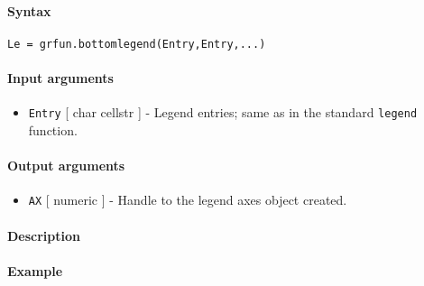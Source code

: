 


	\paragraph{Syntax}

\begin{verbatim}
Le = grfun.bottomlegend(Entry,Entry,...)
\end{verbatim}

\paragraph{Input arguments}

\begin{itemize}
\itemsep1pt\parskip0pt
\item
  \texttt{Entry} {[} char \textbar{} cellstr {]} - Legend entries; same
  as in the standard \texttt{legend} function.
\end{itemize}

\paragraph{Output arguments}

\begin{itemize}
\itemsep1pt\parskip0pt
\item
  \texttt{AX} {[} numeric {]} - Handle to the legend axes object
  created.
\end{itemize}

\paragraph{Description}

\paragraph{Example}


